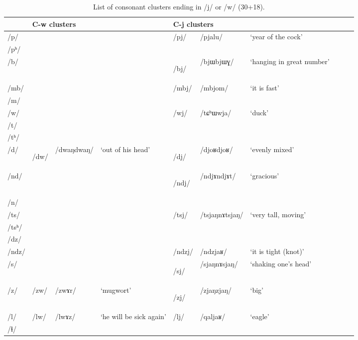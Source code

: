 \documentclass[12pt]{article}
\newcommand{\ipa}[1]{\mbox{\phon/#1/}}
\newcommand{\ipab}[1]{{\phon#1}}
\newcommand{\deux}[1]{\ipa{#1}\addtocounter{2clusters}{1}}
\newcommand{\idph}[1]{\cellcolor{gray}\textbf{#1}}
\begin{document}
%  
  \begin{landscape}
 \begin{longtable}{llllllllll}
 \caption{List of consonant clusters ending in \ipa{j} or \ipa{w} (30+18).} \label{med.w.j} \\
\toprule
 & \multicolumn{3}{l}{C-\ipab{w} clusters} & \multicolumn{3}{l}{C-\ipab{j} clusters}   \\
\midrule
\ipa{p} & & & &\deux{pj} &\ipa{pjalu} & `year of the cock' \\
\ipa{pʰ} & & & & & &\\ 
\ipa{b} & & & &\deux{bj}\idph{} &\ipa{bjɯbjɯɣ} & `hanging in great number' \\ 
\ipa{mb} & & & &\deux{mbj} &\ipa{mbjom} & `it is fast' \\ 
\ipa{m} & & & & & &\\ 
\ipa{w} & & & &\deux{wj} &\ipa{tɕʰɯwja} & `duck' \\ 
\ipa{t} & & & & & &\\ 
\ipa{tʰ} & & & & & &\\ 
\ipa{d} &\deux{dw}\idph{} &\ipa{dwaŋdwaŋ} & `out of his head' &\deux{dj} \idph{} &\ipa{djoʁdjoʁ} & `evenly mixed' \\ 
\ipa{nd} & & & &\deux{ndj} \idph{} &\ipa{ndjɤndjɤt} & `gracious' \\ 
\ipa{n} & & & & & &\\ 
\ipa{ts} & & & & \deux{tsj} &\ipa{tsjaŋnɤtsjaŋ} & `very tall, moving' \\ 
\ipa{tsʰ} & & & & & &\\ 
\ipa{dz} & & & & & &\\ 
\ipa{ndz} & & & &\deux{ndzj} &\ipa{ndzjaʁ} & `it is tight (knot)' \\ 
\ipa{s} & & & &\deux{sj} \idph{} &\ipa{sjaŋnɤsjaŋ} & `shaking one's head' \\ 
\ipa{z} &\deux{zw} &\ipa{zwɤr} & `mugwort' &\deux{zj} \idph{} &\ipa{zjaŋzjaŋ} & `big' \\ 
\ipa{l} &\deux{lw} &\ipa{lwɤz} & `he will be sick again' &\deux{lj} &\ipa{qaljaʁ} & `eagle' \\ 
\ipa{ɬ} & & & & & &\\ 

\end{longtable}
\end{landscape}
\end{document}
